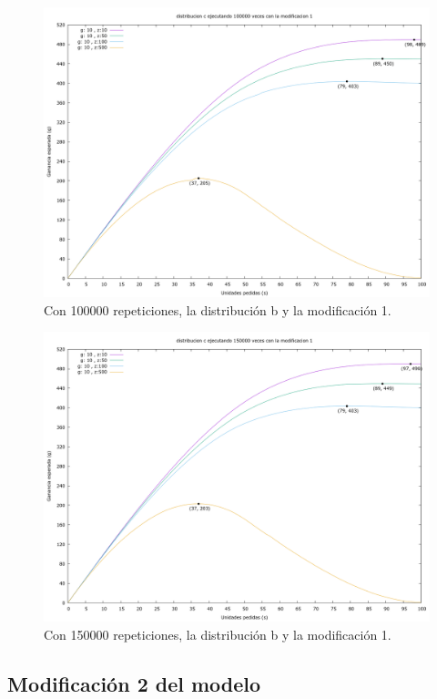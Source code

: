 \documentclass[12pt, spanish]{article}
\begin{document}
\begin{figure}[H]
	\centering
	\includegraphics[scale = 0.3]{prob_c/datos_c_100000_1.png}
	\caption{Con 100000 repeticiones, la distribución b y la modificación 1.}
	\label{fig:ej1_a_100000}

\end{figure}

\begin{figure}[H]
	\centering
	\includegraphics[scale = 0.3]{prob_c/datos_c_150000_1.png}
	\caption{Con 150000 repeticiones, la distribución b y la modificación 1.}
	\label{fig:ej1_a_150000}

\end{figure}

\subsection{Modificación 2 del modelo}
\end{document}
